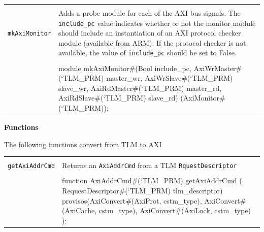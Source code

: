 \documentclass[twoside,letterpaper]{article}
\newcommand{\te}[1]{\texttt{#1}}
\newenvironment{libverbatim}
  {\vspace*{-1.0em}
   \verbatim}
  {\endverbatim
  }
\begin{document}

\begin{center}
\begin{tabular}{|p{1 in}|p{5.2 in}|}
\hline 
&\\
\te{mkAxiMonitor}&Adds a probe module for each of the AXI bus signals.
The \te{include\_pc} value indicates
whether or not the monitor module should include an instantiation of
an AXI protocol checker module (available from ARM).  If the protocol
checker is not available, the value of \te{include\_pc} should be set to False.  \\
&\\
\cline{2-2}
&\begin{libverbatim}
module mkAxiMonitor#(Bool include_pc,
                     AxiWrMaster#(`TLM_PRM) master_wr,
                     AxiWrSlave#(`TLM_PRM)  slave_wr,
                     AxiRdMaster#(`TLM_PRM) master_rd,
                     AxiRdSlave#(`TLM_PRM)  slave_rd) 
                     (AxiMonitor#(`TLM_PRM));
\end{libverbatim}
\\
\hline
\end{tabular}
\end{center}

{\bf Functions}

The following functions convert from TLM to AXI


\begin{center}
\begin{tabular}{|p{1.2 in}|p{5 in}|}
\hline 
&\\
\te{getAxiAddrCmd}&Returns an \te{AxiAddrCmd} from a TLM \te{RquestDescriptor}   \\
&\\
\cline{2-2}
&\begin{libverbatim}
function AxiAddrCmd#(`TLM_PRM) getAxiAddrCmd (
                      RequestDescriptor#(`TLM_PRM) tlm_descriptor)
   provisos(AxiConvert#(AxiProt, cstm_type),
            AxiConvert#(AxiCache, cstm_type),
            AxiConvert#(AxiLock, cstm_type) );
\end{libverbatim}
\\
\hline
\end{tabular}
\end{center}

\end{document}
